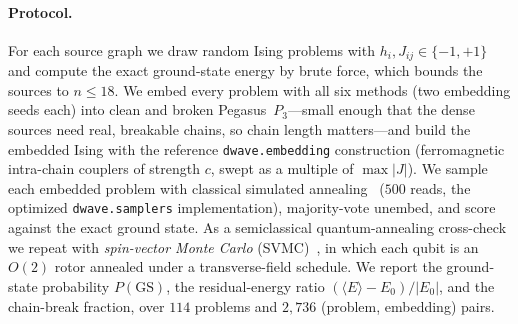 \documentclass[acmsmall,anonymous,nonacm]{acmart}
\begin{document}
\paragraph{Protocol.} For each source graph we draw random Ising problems with
$h_i,J_{ij}\in\{-1,+1\}$ and compute the exact ground-state energy by brute force,
which bounds the sources to $n\le 18$. We embed every problem with all six methods
(two embedding seeds each) into clean and broken Pegasus~$P_3$---small enough that
the dense sources need real, breakable chains, so chain length matters---and build
the embedded Ising with the reference \texttt{dwave.embedding} construction
(ferromagnetic intra-chain couplers of strength $c$, swept as a multiple of
$\max|J|$). We sample each embedded problem with classical simulated
annealing~\cite{kirkpatrick1983sa,isakov2015sa} ($500$ reads, the optimized
\texttt{dwave.samplers} implementation), majority-vote unembed, and score against the
exact ground state. As a semiclassical quantum-annealing cross-check we repeat with
\emph{spin-vector Monte Carlo} (SVMC)~\cite{shin2014svmc}, in which each qubit is an
$O(2)$ rotor annealed under a transverse-field schedule. We report the
ground-state probability $P(\mathrm{GS})$, the residual-energy ratio
$(\langle E\rangle-E_0)/|E_0|$, and the chain-break fraction, over $114$ problems and
$2{,}736$ (problem, embedding) pairs.
\end{document}
